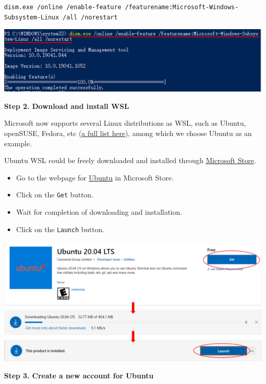 \documentclass[
]{book}
\providecommand{\tightlist}{%
  \setlength{\itemsep}{0pt}\setlength{\parskip}{0pt}}
\begin{document}
\begin{verbatim}
dism.exe /online /enable-feature /featurename:Microsoft-Windows-Subsystem-Linux /all /norestart
\end{verbatim}

\begin{center}\includegraphics[width=0.6\linewidth]{./images/wsl_enable_feature} \end{center}

\textbf{Step 2. Download and install WSL}

Microsoft now supports several Linux distributions as WSL, such as Ubuntu, openSUSE, Fedora, etc (\href{https://docs.microsoft.com/en-us/windows/wsl/install-win10\#step-6---install-your-linux-distribution-of-choice}{a full list here}), among which we choose Ubuntu as an example.

Ubuntu WSL could be freely downloaded and installed through \href{https://www.microsoft.com/en-us/p/ubuntu-2004-lts/9n6svws3rx71?rtc=1\&activetab=pivot:overviewtab}{Microsoft Store}.

\begin{itemize}
\tightlist
\item
  Go to the webpage for \href{https://www.microsoft.com/en-us/p/ubuntu-2004-lts/9n6svws3rx71?rtc=1\&activetab=pivot:overviewtab}{Ubuntu} in Microsoft Store.
\item
  Click on the \texttt{Get} button.
\item
  Wait for completion of downloading and installation.
\item
  Click on the \texttt{Launch} button.
\end{itemize}

\begin{center}\includegraphics[width=0.6\linewidth]{./images/wsl_download_install} \end{center}

\textbf{Step 3. Create a new account for Ubuntu}
\end{document}
